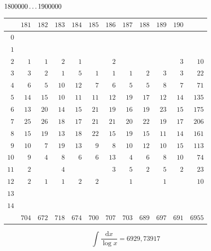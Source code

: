 \clearpage
\noindent\begin{minipage}{\linewidth}\centering
{}
\(1800000\mathinner{.\,.\,.}1900000\)\par\smallskip
\begingroup\fontsize{10.5}{11.5}\selectfont\setlength{\tabcolsep}{3.5pt}\renewcommand{\arraystretch}{1}
\begin{tabular}{r|rrrrrrrrrr|r}\hline
 & $181$ & $182$ & $183$ & $184$ & $185$ & $186$ & $187$ & $188$ & $189$ & $190$ &  \\ \hline
$0$ &  &  &  &  &  &  &  &  &  &  &  \\
$1$ &  &  &  &  &  &  &  &  &  &  &  \\
$2$ & $1$ & $1$ & $2$ & $1$ &  & $2$ &  &  &  & $3$ & $10$ \\
$3$ & $3$ & $2$ & $1$ & $5$ & $1$ & $1$ & $1$ & $2$ & $3$ & $3$ & $22$ \\
$4$ & $6$ & $5$ & $10$ & $12$ & $7$ & $6$ & $5$ & $5$ & $8$ & $7$ & $71$ \\
$5$ & $14$ & $15$ & $10$ & $11$ & $11$ & $12$ & $19$ & $17$ & $12$ & $14$ & $135$ \\
$6$ & $13$ & $20$ & $14$ & $15$ & $21$ & $19$ & $16$ & $19$ & $23$ & $15$ & $175$ \\
$7$ & $25$ & $26$ & $18$ & $17$ & $21$ & $21$ & $20$ & $22$ & $19$ & $17$ & $206$ \\
$8$ & $15$ & $19$ & $13$ & $18$ & $22$ & $15$ & $19$ & $15$ & $11$ & $14$ & $161$ \\
$9$ & $10$ & $7$ & $19$ & $13$ & $9$ & $8$ & $10$ & $12$ & $10$ & $15$ & $113$ \\
$10$ & $9$ & $4$ & $8$ & $6$ & $6$ & $13$ & $4$ & $6$ & $8$ & $10$ & $74$ \\
$11$ & $2$ &  & $4$ &  &  & $3$ & $5$ & $2$ & $5$ & $2$ & $23$ \\
$12$ & $2$ & $1$ & $1$ & $2$ & $2$ &  & $1$ &  & $1$ &  & $10$ \\
$13$ &  &  &  &  &  &  &  &  &  &  &  \\
$14$ &  &  &  &  &  &  &  &  &  &  &  \\
\hline
 & $704$ & $672$ & $718$ & $674$ & $700$ & $707$ & $703$ & $689$ & $697$ & $691$ & $6955$ \\ \hline
\end{tabular}\par\endgroup
\setlength{\abovedisplayskip}{6pt}\setlength{\belowdisplayskip}{4pt}
\[\int\frac{\mathrm{d}x}{\log x}=6929{,}73917\]
\end{minipage}\par

